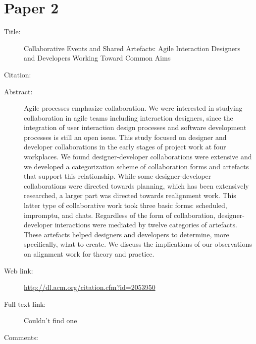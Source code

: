 \documentclass{scrartcl}
\begin{document}
\section*{Paper 2}
\begin{description}
\item[Title:] Collaborative Events and Shared Artefacts: Agile Interaction Designers and Developers Working Toward Common Aims
\item[Citation:] \cite{Brown}
\item[Abstract:] Agile processes emphasize collaboration. We were interested in studying collaboration in agile teams including interaction designers, since the integration of user interaction design processes and software development processes is still an open issue. This study focused on designer and developer collaborations in the early stages of project work at four workplaces. We found designer-developer collaborations were extensive and we developed a categorization scheme of collaboration forms and artefacts that support this relationship. While some designer-developer collaborations were directed towards planning, which has been extensively researched, a larger part was directed towards realignment work. This latter type of collaborative work took three basic forms: scheduled, impromptu, and chats. Regardless of the form of collaboration, designer-developer interactions were mediated by twelve categories of artefacts. These artefacts helped designers and developers to determine, more specifically, what to create. We discuss the implications of our observations on alignment work for theory and practice.
\item[Web link:] \url{http://dl.acm.org/citation.cfm?id=2053950}
\item[Full text link:] Couldn't find one
\item[Comments:]  
\end{description}
\end{document}
